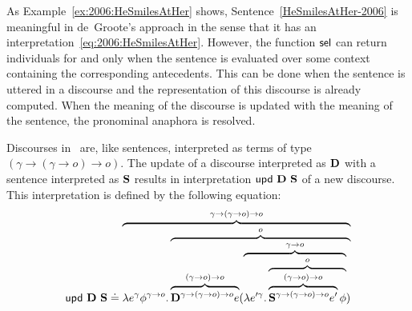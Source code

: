 As Example~\ref{ex:2006:HeSmilesAtHer} shows, Sentence~\eqref{HeSmilesAtHer-2006} is meaningful in de~Groote's approach in the sense that it has an interpretation~\eqref{eq:2006:HeSmilesAtHer}. However, the function $\selK$ can return individuals for  and  only when the sentence is evaluated over some context containing the corresponding antecedents. This can be done when the sentence is uttered in a discourse and the representation of this discourse is already computed. When the meaning of the discourse is updated with the meaning of the sentence, the pronominal anaphora is resolved. 

Discourses in~\cite{deGroote:2006:Towards-a-Montagovian-Account-of-Dynamics} are, like sentences, interpreted as terms of type $(\gamma \rightarrow (\gamma \rightarrow o) \rightarrow o)$.  The update of a discourse interpreted as $\D$ with a sentence interpreted as $\S$ results in interpretation $\updt \ \D \ \S$ of a new discourse. This interpretation is defined by the following equation:
\begin{align}
\updt \ \D \ \S \defeq \overbrace{\lambda e^{\gamma} \phi^{\gamma \rightarrow o}. \overbrace{ \overbrace{\D^{\gamma \rightarrow (\gamma \rightarrow o) \rightarrow o}  e}^{(\gamma \rightarrow o) \rightarrow o} (\overbrace{\lambda e'^{\gamma}. \overbrace{\overbrace{\S^{\gamma \rightarrow (\gamma \rightarrow o) \rightarrow o}  e'}^{ (\gamma \rightarrow o) \rightarrow o} \phi}^{o}}^{\gamma \rightarrow o})}^{o}}^{\gamma \rightarrow (\gamma \rightarrow o) \rightarrow o} \label{eq:updtDS:2006}
\end{align}

